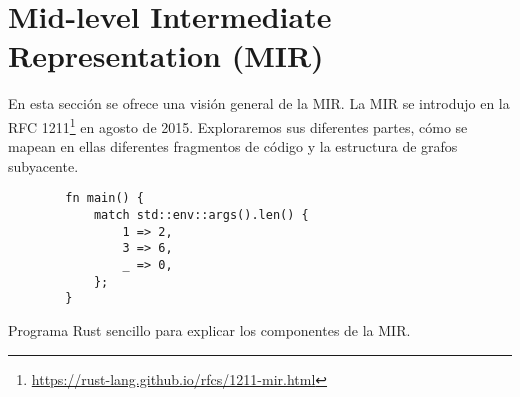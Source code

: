 \section{Mid-level Intermediate Representation (MIR)}

En esta sección se ofrece una visión general de la \acrfull{MIR}.
La \acrshort{MIR} se introdujo
en la RFC 1211\footnote{\url{https://rust-lang.github.io/rfcs/1211-mir.html}}
en agosto de 2015.
Exploraremos sus diferentes partes,
cómo se mapean en ellas diferentes fragmentos de código
y la estructura de grafos subyacente.

\begin{listing}[!htb]
    \begin{verbatim}
        fn main() {
            match std::env::args().len() {
                1 => 2,
                3 => 6,
                _ => 0,
            };
        }
    \end{verbatim}
    \caption{Programa Rust sencillo para explicar los componentes de la MIR.}
    \label{lst:rust-code-example}
\end{listing}

